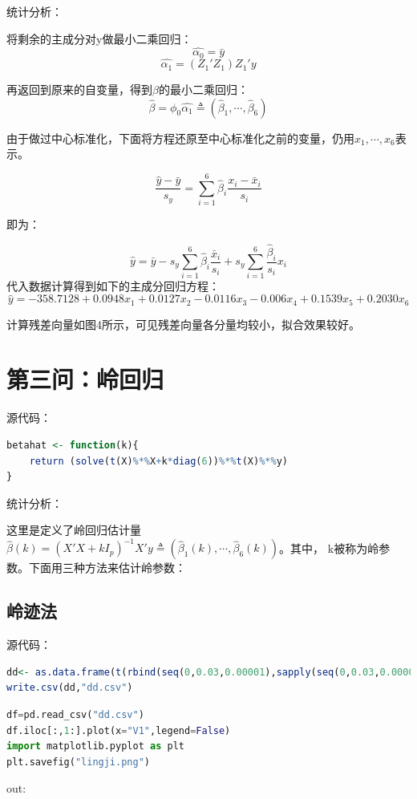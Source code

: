 \documentclass[a4paper,12pt]{article}
\begin{document}
统计分析：

将剩余的主成分对y做最小二乘回归：
$$\hat{\alpha_0}=\bar{y}$$
$$\hat{\alpha_1}=(Z_1'Z_1)Z_1'y$$

再返回到原来的自变量，得到$\beta$的最小二乘回归：
$$\hat{\beta}=\phi_0\hat{\alpha_1}\triangleq (\hat{\beta}_1,\cdots,\hat{\beta}_6)$$

由于做过中心标准化，下面将方程还原至中心标准化之前的变量，仍用$x_1,\cdots,x_6$表示。

$$\frac{\hat{y}-\bar{y}}{s_y}=\sum_{i=1}^{6}\hat{\beta}_i \frac{x_i-\bar{x}_i}{s_i}$$

即为：

$$\hat{y}=\bar{y}-s_y \sum_{i=1}^{6} \hat{\beta}_i \frac{\bar{x}_i}{s_i} + s_y \sum_{i=1}^{6} \frac{\hat{\beta}_i}{s_i} x_i$$
代入数据计算得到如下的主成分回归方程：
$$\hat{y}=-358.7128+0.0948x_1+0.0127x_2-0.0116x_3-0.006x_4+0.1539x_5+0.2030x_6$$

计算残差向量如图4所示，可见残差向量各分量均较小，拟合效果较好。
\section{第三问：岭回归}

源代码：

\begin{lstlisting}[language=r,breaklines]
betahat <- function(k){
    return (solve(t(X)%*%X+k*diag(6))%*%t(X)%*%y)
}
\end{lstlisting}

统计分析：

这里是定义了岭回归估计量$\hat{\beta}(k)=(X'X+kI_p)^{-1}X'y\triangleq (\hat{\beta}_1 (k),\cdots,\hat{\beta}_6 (k))$。其中，
k被称为岭参数。下面用三种方法来估计岭参数：

\subsection{岭迹法}

源代码：

\begin{lstlisting}[language=r,breaklines]
dd<- as.data.frame(t(rbind(seq(0,0.03,0.00001),sapply(seq(0,0.03,0.00001),betahat))))
write.csv(dd,"dd.csv")
\end{lstlisting}
\begin{lstlisting}[language=python,breaklines]
df=pd.read_csv("dd.csv")
df.iloc[:,1:].plot(x="V1",legend=False)
import matplotlib.pyplot as plt
plt.savefig("lingji.png")
\end{lstlisting}
out: 
\end{document}
